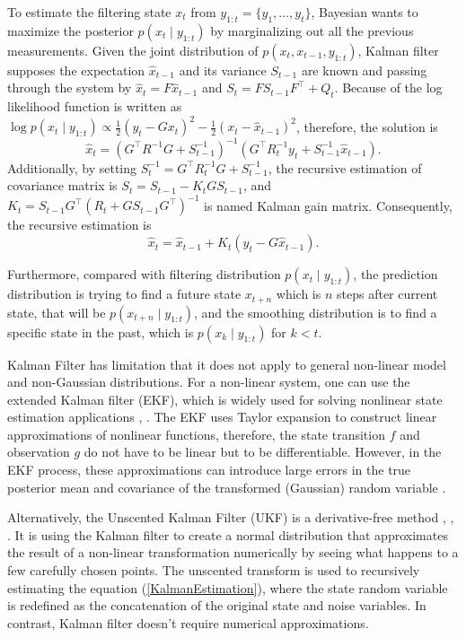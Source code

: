 To estimate the filtering state $x_t$ from $y_{1:t}=\{y_1,\ldots,y_t\}$, Bayesian wants to maximize the posterior $p(x_t\mid y_{1:t})$ by marginalizing out all the previous measurements. Given the joint distribution of $p(x_t,x_{t-1},y_{1:t})$, Kalman filter supposes the expectation $\hat{x}_{t-1}$ and its variance $S_{t-1}$ are known and passing through the system by $\hat{x}_t=F\hat{x}_{t-1}$ and $S_t=FS_{t-1}F^\top + Q_t$. Because of the log likelihood function is written as
$\log p(x_t\mid y_{1:t}) \propto \frac{1}{2}(y_t-Gx_t)^2-\frac{1}{2}(x_t-\hat{x}_{t-1})^2$,
therefore, the solution is 
\begin{equation*}
\hat{x}_t = \left(G^\top R^{-1}G+S_{t-1}^{-1}\right)^{-1}\left( G^\top R_t^{-1}y_t+S_{t-1}^{-1}\hat{x}_{t-1} \right).
\end{equation*}
Additionally, by setting $S_t^{-1} = G^\top R_t^{-1}G+S_{t-1}^{-1}$, the recursive estimation of covariance matrix is $S_t = S_{t-1} - K_t GS_{t-1}$, 
and $K_t = S_{t-1} G^\top (R_t +GS_{t-1}G^\top)^{-1}$ is named Kalman gain matrix. Consequently, the recursive estimation is 
\begin{equation}\label{KalmanEstimation}
\hat{x}_t = \hat{x}_{t-1}+K_t(y_t-G\hat{x}_{t-1}).
\end{equation}


Furthermore, compared with filtering distribution $p(x_t\mid y_{1:t})$, the prediction distribution is trying to find a future state $x_{t+n}$ which is $n$ steps after current state, that will be $p(x_{t+n}\mid y_{1:t})$, and the smoothing distribution is to find a specific state in the past, which is $p(x_k\mid y_{1:t})$ for $k<t$. 


Kalman Filter has limitation that it does not apply to general non-linear model and non-Gaussian distributions. For a non-linear system, one can use the extended Kalman filter (EKF), which is widely used for solving nonlinear state estimation applications \cite{gelb1974applied}, \cite{bar1993estimation}. The EKF uses Taylor expansion to construct linear approximations of nonlinear functions, therefore, the state transition $f$ and observation $g$ do not have to be linear but to be differentiable. However, in the EKF process, these approximations can introduce large errors in the true posterior mean and covariance of the transformed (Gaussian) random variable \cite{wan2000unscented}. 


Alternatively, the Unscented Kalman Filter (UKF) is a derivative-free method \cite{julier1997new}, \cite{wan2000unscented}, \cite{gyorgy2014unscented}. It is using the Kalman filter to create a normal distribution that approximates the result of a non-linear transformation numerically by seeing what happens to a few carefully chosen points. The unscented transform is used to recursively estimating the equation (\ref{KalmanEstimation}), where the state random variable is redefined as the concatenation of the original state and noise variables. In contrast, Kalman filter doesn't require numerical approximations. 


